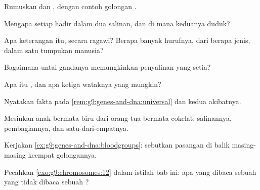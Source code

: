 \begin{exercise}[$\star$]\label{exo:g9:genes-and-dna:1}
Rumuskan  dan , dengan contoh golongan .
\end{exercise}

\begin{exercise}[$\star$]\label{exo:g9:genes-and-dna:2}
Mengapa setiap  hadir dalam dua salinan, dan di mana
keduanya duduk?
\end{exercise}

\begin{exercise}[$\star$]\label{exo:g9:genes-and-dna:3}
Apa keterangan  itu, secara ragawi? Berapa banyak
hurufnya, dari berapa jenis, dalam satu tumpukan manusia?
\end{exercise}

\begin{exercise}[$\star$]\label{exo:g9:genes-and-dna:4}
Bagaimana untai gandanya memungkinkan penyalinan yang
setia?
\end{exercise}

\begin{exercise}[$\star$]\label{exo:g9:genes-and-dna:5}
Apa itu , dan apa ketiga wataknya yang mungkin?
\end{exercise}

\begin{exercise}[$\star$]\label{exo:g9:genes-and-dna:6}
Nyatakan fakta pada \cref{rem:g9:genes-and-dna:universal}
dan kedua akibatnya.
\end{exercise}

\begin{exercise}[$\star\star$]\label{exo:g9:genes-and-dna:7}
Mesinkan anak bermata biru dari orang tua bermata cokelat:
salinannya, pembagiannya, dan satu-dari-empatnya.
\end{exercise}

\begin{exercise}[$\star\star$]\label{exo:g9:genes-and-dna:8}
Kerjakan \cref{ex:g9:genes-and-dna:bloodgroups}: sebutkan
pasangan  di balik masing-masing keempat golongannya.
\end{exercise}

\begin{exercise}[$\star\star$]\label{exo:g9:genes-and-dna:9}
Pecahkan \cref{exo:g9:chromosomes:12} dalam istilah bab ini:
apa yang dibaca sebuah  yang tidak dibaca sebuah 
?
\end{exercise}

